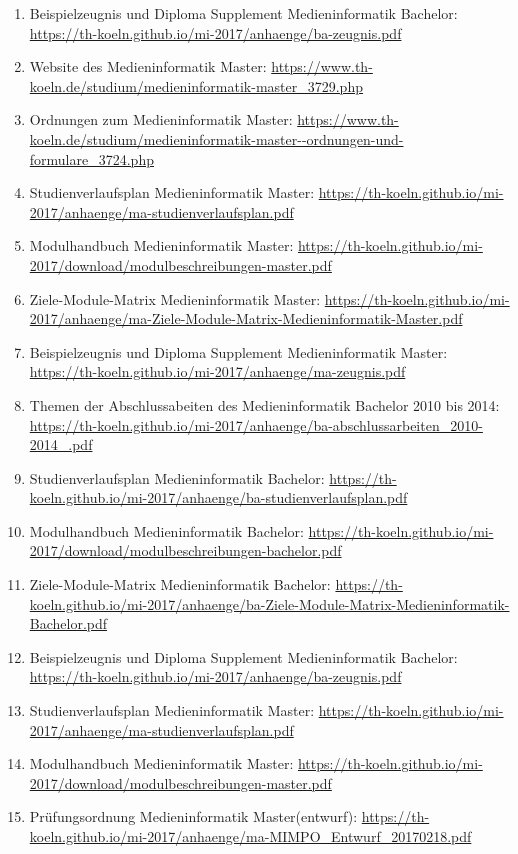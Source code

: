 \documentclass[BCOR12mm,DIV11,titlepage,a4paper,oneside,10pt]{scrbook}
\begin{document}
\begin{sloppypar}
\begin{flushleft}
\begin{enumerate}
\item{Beispielzeugnis und Diploma Supplement Medieninformatik Bachelor: \url{https://th-koeln.github.io/mi-2017/anhaenge/ba-zeugnis.pdf} } 
\item{Website des Medieninformatik Master: \url{https://www.th-koeln.de/studium/medieninformatik-master\_3729.php} } 
\item{Ordnungen zum Medieninformatik Master: \url{https://www.th-koeln.de/studium/medieninformatik-master--ordnungen-und-formulare\_3724.php} } 
\item{Studienverlaufsplan Medieninformatik Master: \url{https://th-koeln.github.io/mi-2017/anhaenge/ma-studienverlaufsplan.pdf} } 
\item{Modulhandbuch Medieninformatik Master: \url{https://th-koeln.github.io/mi-2017/download/modulbeschreibungen-master.pdf} } 
\item{Ziele-Module-Matrix Medieninformatik Master: \url{https://th-koeln.github.io/mi-2017/anhaenge/ma-Ziele-Module-Matrix-Medieninformatik-Master.pdf} } 
\item{Beispielzeugnis und Diploma Supplement Medieninformatik Master: \url{https://th-koeln.github.io/mi-2017/anhaenge/ma-zeugnis.pdf} } 
\item{Themen der Abschlussabeiten des Medieninformatik Bachelor 2010 bis 2014: \url{https://th-koeln.github.io/mi-2017/anhaenge/ba-abschlussarbeiten\_2010-2014\_.pdf} } 
\item{Studienverlaufsplan Medieninformatik Bachelor: \url{https://th-koeln.github.io/mi-2017/anhaenge/ba-studienverlaufsplan.pdf} } 
\item{Modulhandbuch Medieninformatik Bachelor: \url{https://th-koeln.github.io/mi-2017/download/modulbeschreibungen-bachelor.pdf} } 
\item{Ziele-Module-Matrix Medieninformatik Bachelor: \url{https://th-koeln.github.io/mi-2017/anhaenge/ba-Ziele-Module-Matrix-Medieninformatik-Bachelor.pdf} } 
\item{Beispielzeugnis und Diploma Supplement Medieninformatik Bachelor: \url{https://th-koeln.github.io/mi-2017/anhaenge/ba-zeugnis.pdf} } 
\item{Studienverlaufsplan Medieninformatik Master: \url{https://th-koeln.github.io/mi-2017/anhaenge/ma-studienverlaufsplan.pdf} } 
\item{Modulhandbuch Medieninformatik Master: \url{https://th-koeln.github.io/mi-2017/download/modulbeschreibungen-master.pdf} } 
\item{Prüfungsordnung Medieninformatik Master(entwurf): \url{https://th-koeln.github.io/mi-2017/anhaenge/ma-MIMPO\_Entwurf\_20170218.pdf} } 

\end{enumerate}
\end{flushleft}
\end{sloppypar}
\end{document}
